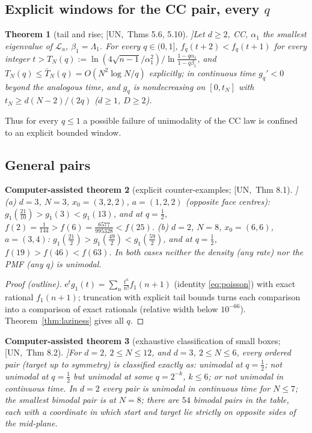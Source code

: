 \documentclass[10pt,a4paper]{article}
\theoremstyle{plain}
\newtheorem{theorem}{Theorem}[section]
\newtheorem{catheorem}[theorem]{Computer-assisted theorem}
\theoremstyle{definition}
\newcommand{\src}[2]{[\textsf{#1},~#2]}           %
\newcommand{\UNI}{\textsf{UN}}
\newcommand{\Lg}{\mathcal{L}}
\newcommand{\ee}{\mathrm{e}}
\begin{document}
\subsection{Explicit windows for the CC pair, every $q$}

\begin{theorem}[tail and rise; \src{\UNI}{Thms 5.6, 5.10}]\label{thm:tailrise}
Let $d\ge2$, CC, $\alpha_1$ the smallest eigenvalue of $\Lg_a$, $\beta_1=\Lambda_1$. For every $q\in(0,1]$, $f_q(t+2)<f_q(t+1)$ for every integer $t>T_N(q):=\ln(4\sqrt{n-1}/\alpha_1^2)/\ln\frac{1-q\alpha_1}{1-q\beta_1}$, and $T_N(q)\le\bar T_N(q)=O(N^2\log N/q)$ explicitly; in continuous time $g_q'<0$ beyond the analogous time, and $g_q$ is nondecreasing on $[0,t_N]$ with $t_N\ge d(N-2)/(2q)$ ($d\ge1$, $D\ge2$).
\end{theorem}
Thus for every $q\le1$ a possible failure of unimodality of the CC law is confined to an explicit bounded window.

\subsection{General pairs}

\begin{catheorem}[explicit counter-examples; \src{\UNI}{Thm 8.1}]\label{thm:generalpairs}
(a) $d=3$, $N=3$, $x_0=(3,2,2)$, $a=(1,2,2)$ (opposite face centres): $g_1(\frac{21}{10})>g_1(3)<g_1(13)$, and at $q=\frac12$, $f(2)=\frac1{144}>f(6)=\frac{6577}{995328}<f(25)$.
(b) $d=2$, $N=8$, $x_0=(6,6)$, $a=(3,4)$: $g_1(\frac{21}2)>g_1(\frac{49}2)<g_1(\frac{59}2)$, and at $q=\frac12$, $f(19)>f(46)<f(63)$.
In both cases neither the density (any rate) nor the PMF (any $q$) is unimodal.
\end{catheorem}
\begin{proof}[Proof (outline)]
$\ee^tg_1(t)=\sum_n\frac{t^n}{n!}f_1(n+1)$ (identity \eqref{eq:poisson}) with exact rational $f_1(n+1)$; truncation with explicit tail bounds turns each comparison into a comparison of exact rationals (relative width below $10^{-66}$). Theorem~\ref{thm:laziness} gives all $q$.
\end{proof}

\begin{catheorem}[exhaustive classification of small boxes; \src{\UNI}{Thm 8.2}]\label{thm:pairclass}
For $d=2$, $2\le N\le12$, and $d=3$, $2\le N\le6$, every ordered pair (target up to symmetry) is classified exactly as: unimodal at $q=\frac12$; not unimodal at $q=\frac12$ but unimodal at some $q=2^{-k}$, $k\le6$; or not unimodal in continuous time. In $d=2$ every pair is unimodal in continuous time for $N\le7$; the smallest bimodal pair is at $N=8$; there are $54$ bimodal pairs in the table, each with a coordinate in which start and target lie strictly on opposite sides of the mid-plane.
\end{catheorem}
\end{document}
